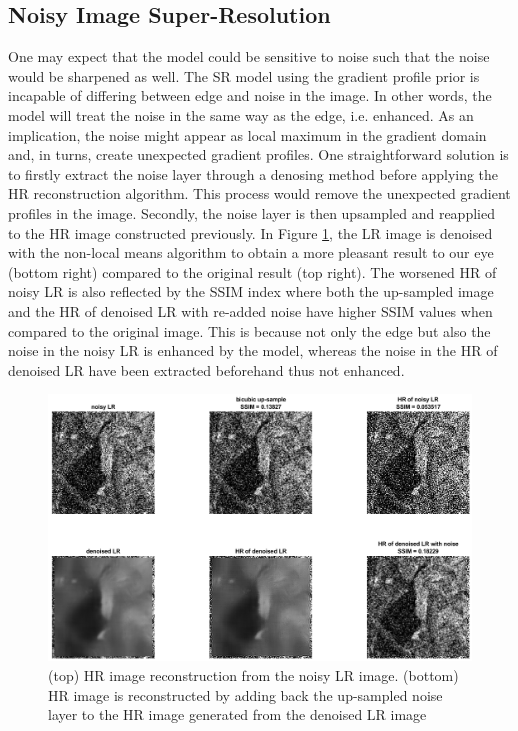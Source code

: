 \documentclass[a4paper,11pt]{article}
\begin{document}
\subsection{Noisy Image Super-Resolution}

One may expect that the model could be sensitive to noise such that the noise would be sharpened as well. The SR model using the gradient profile prior is incapable of differing between edge and noise in the image. In other words, the model will treat the noise in the same way as the edge, i.e. enhanced. As an implication, the noise might appear as local maximum in the gradient domain and, in turns, create unexpected gradient profiles. One straightforward solution is to firstly extract the noise layer through a denosing method before applying the HR reconstruction algorithm. This process would remove the unexpected gradient profiles in the image. Secondly, the noise layer is then upsampled and reapplied to the HR image constructed previously. In Figure \ref{fig:sden}, the LR image is denoised with the non-local means algorithm \cite{nlm05} to obtain a more pleasant result to our eye (bottom right) compared to the original result (top right). The worsened HR of noisy LR is also reflected by the SSIM index where both the up-sampled image and the HR of denoised LR with re-added noise have higher SSIM values when compared to the original image. This is because not only the edge but also the noise in the noisy LR is enhanced by the model, whereas the noise in the HR of denoised LR have been extracted beforehand thus not enhanced. 

\begin{figure}[H]
	\centering
	\includegraphics[width=1\textwidth]{simple denoise.png}
	\caption{(top) HR image reconstruction from the noisy LR image. (bottom) HR image is reconstructed by adding back the up-sampled noise layer to the HR image generated from the denoised LR image}
	\label{fig:sden}
\end{figure}
\end{document}
